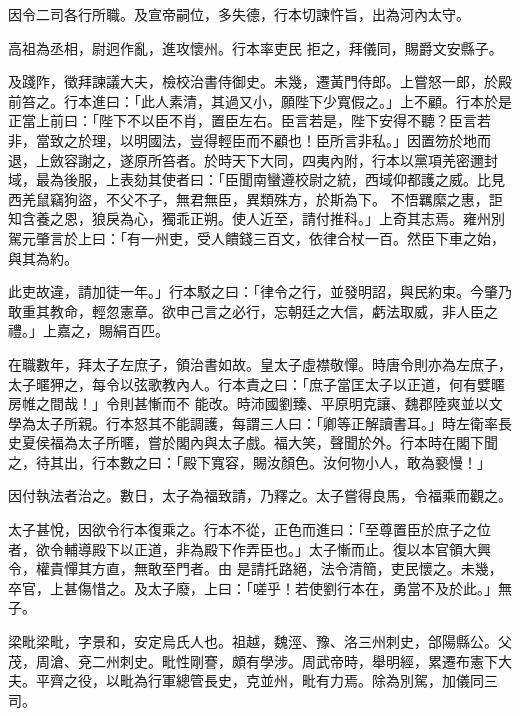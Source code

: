 \begin{pinyinscope}
 因令二司各行所職。及宣帝嗣位，多失德，行本切諫忤旨，出為河內太守。



 高祖為丞相，尉迥作亂，進攻懷州。行本率吏民
 拒之，拜儀同，賜爵文安縣子。



 及踐阼，徵拜諫議大夫，檢校治書侍御史。未幾，遷黃門侍郎。上嘗怒一郎，於殿前笞之。行本進曰：「此人素清，其過又小，願陛下少寬假之。」上不顧。行本於是正當上前曰：「陛下不以臣不肖，置臣左右。臣言若是，陛下安得不聽？臣言若非，當致之於理，以明國法，豈得輕臣而不顧也！臣所言非私。」因置笏於地而退，上斂容謝之，遂原所笞者。於時天下大同，四夷內附，行本以黨項羌密邇封域，最為後服，上表劾其使者曰：「臣聞南蠻遵校尉之統，西域仰都護之威。比見西羌鼠竊狗盜，不父不子，無君無臣，異類殊方，於斯為下。
 不悟羈縻之惠，詎知含養之恩，狼戾為心，獨乖正朔。使人近至，請付推科。」上奇其志焉。雍州別駕元肇言於上曰：「有一州吏，受人饋錢三百文，依律合杖一百。然臣下車之始，與其為約。



 此吏故違，請加徒一年。」行本駁之曰：「律令之行，並發明詔，與民約束。今肇乃敢重其教命，輕忽憲章。欲申己言之必行，忘朝廷之大信，虧法取威，非人臣之禮。」上嘉之，賜絹百匹。



 在職數年，拜太子左庶子，領治書如故。皇太子虛襟敬憚。時唐令則亦為左庶子，太子暱狎之，每令以弦歌教內人。行本責之曰：「庶子當匡太子以正道，何有嬖暱房帷之間哉！」令則甚慚而不
 能改。時沛國劉臻、平原明克讓、魏郡陸爽並以文學為太子所親。行本怒其不能調護，每謂三人曰：「卿等正解讀書耳。」時左衛率長史夏侯福為太子所暱，嘗於閣內與太子戲。福大笑，聲聞於外。行本時在閣下聞之，待其出，行本數之曰：「殿下寬容，賜汝顏色。汝何物小人，敢為褻慢！」



 因付執法者治之。數日，太子為福致請，乃釋之。太子嘗得良馬，令福乘而觀之。



 太子甚悅，因欲令行本復乘之。行本不從，正色而進曰：「至尊置臣於庶子之位者，欲令輔導殿下以正道，非為殿下作弄臣也。」太子慚而止。復以本官領大興令，權貴憚其方直，無敢至門者。由
 是請托路絕，法令清簡，吏民懷之。未幾，卒官，上甚傷惜之。及太子廢，上曰：「嗟乎！若使劉行本在，勇當不及於此。」無子。



 梁毗梁毗，字景和，安定烏氏人也。祖越，魏涇、豫、洛三州刺史，郃陽縣公。父茂，周滄、兗二州刺史。毗性剛謇，頗有學涉。周武帝時，舉明經，累遷布憲下大夫。平齊之役，以毗為行軍總管長史，克並州，毗有力焉。除為別駕，加儀同三司。




\end{pinyinscope}
